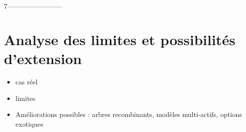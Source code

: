 7------------------------
\section{Analyse des limites et possibilités d'extension}
\begin{itemize}
    \item cas réel
    \item limites
    \item Améliorations possibles : arbres recombinants, modèles multi-actifs, options exotiques
\end{itemize}